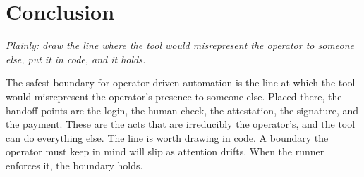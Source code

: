 \documentclass[11pt]{article}
\begin{document}
\section{Conclusion}
\emph{Plainly: draw the line where the tool would misrepresent the operator to someone else, put it in code, and it holds.}

The safest boundary for operator-driven automation is the line at which the tool would misrepresent the operator's presence to someone else. Placed there, the handoff points are the login, the human-check, the attestation, the signature, and the payment. These are the acts that are irreducibly the operator's, and the tool can do everything else. The line is worth drawing in code. A boundary the operator must keep in mind will slip as attention drifts. When the runner enforces it, the boundary holds.
\end{document}
